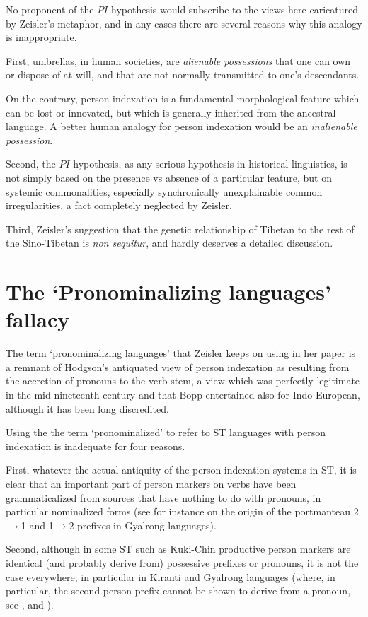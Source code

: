\documentclass[oldfontcommands,oneside,a4paper,11pt]{article}
\begin{document}
No proponent of the $PI$ hypothesis would subscribe to the views here caricatured by Zeisler's metaphor, and in any cases there are several reasons why this analogy is inappropriate. 

First, umbrellas, in human societies, are \textit{alienable possessions} that one can own or dispose of at will, and that are not normally transmitted to one's descendants.

On the contrary, person indexation is a fundamental morphological feature which can be lost or innovated, but which is generally inherited from the ancestral language. A better human analogy for person indexation would be an \textit{inalienable possession}.

Second, the $PI$ hypothesis, as any serious hypothesis in historical linguistics, is not simply based on the presence vs absence of a particular feature, but on systemic commonalities, especially synchronically unexplainable common irregularities, a fact completely neglected by Zeisler.

Third, Zeisler's suggestion that the genetic relationship of Tibetan to the rest of the Sino-Tibetan is \textit{non sequitur}, and hardly deserves a detailed discussion.


\section{The `Pronominalizing languages' fallacy}
The term `pronominalizing languages' that Zeisler keeps on using in her paper is a remnant of Hodgson's antiquated view of person indexation as resulting from the accretion of pronouns to the verb stem, a view which was perfectly legitimate in the mid-nineteenth century and that Bopp entertained also for Indo-European, although it has been long discredited. 

Using the the term `pronominalized' to refer to ST languages with person indexation is inadequate for four reasons.

First, whatever the actual antiquity of the person indexation systems in ST, it is clear that an important part of person markers on verbs have been grammaticalized from sources that have nothing to do with pronouns, in particular nominalized forms (see for instance \citealt{jacques15generic} on the origin of the portmanteau 2$\rightarrow$1 and 1$\rightarrow$2 prefixes in Gyalrong languages).

Second, although in some ST such as Kuki-Chin productive person markers are identical (and probably derive from) possessive prefixes or pronouns, it is not the case everywhere, in particular in Kiranti and Gyalrong languages (where, in particular, the second person prefix cannot be shown to derive from a pronoun, see \citealt{jacques12agreement}, \citealt{delancey11prefixes} and \citealt{delancey14second}).
\end{document}
